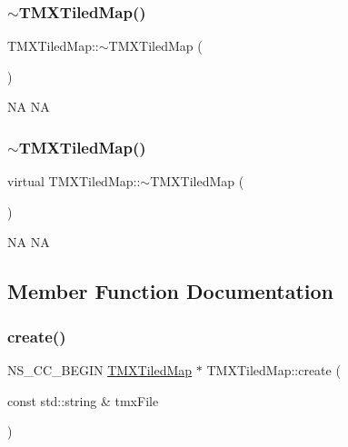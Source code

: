 \subsubsection{\texorpdfstring{$\sim$\+T\+M\+X\+Tiled\+Map()}{~TMXTiledMap()}\hspace{0.1cm}{\footnotesize\ttfamily [1/2]}}
{\footnotesize\ttfamily T\+M\+X\+Tiled\+Map\+::$\sim$\+T\+M\+X\+Tiled\+Map (\begin{DoxyParamCaption}{ }\end{DoxyParamCaption})\hspace{0.3cm}{\ttfamily [virtual]}}

NA  NA \mbox{\label{classTMXTiledMap_a4b8952527c10c7ab9397e215b7bd116c}} 
\subsubsection{\texorpdfstring{$\sim$\+T\+M\+X\+Tiled\+Map()}{~TMXTiledMap()}\hspace{0.1cm}{\footnotesize\ttfamily [2/2]}}
{\footnotesize\ttfamily virtual T\+M\+X\+Tiled\+Map\+::$\sim$\+T\+M\+X\+Tiled\+Map (\begin{DoxyParamCaption}{ }\end{DoxyParamCaption})\hspace{0.3cm}{\ttfamily [virtual]}}

NA  NA 

\subsection{Member Function Documentation}
\mbox{\label{classTMXTiledMap_a64387b3c4d0369044917a4ef43f31aa0}} 
\subsubsection{\texorpdfstring{create()}{create()}\hspace{0.1cm}{\footnotesize\ttfamily [1/2]}}
{\footnotesize\ttfamily N\+S\+\_\+\+C\+C\+\_\+\+B\+E\+G\+IN \hyperlink{classTMXTiledMap}{T\+M\+X\+Tiled\+Map} $\ast$ T\+M\+X\+Tiled\+Map\+::create (\begin{DoxyParamCaption}\item[{const std\+::string \&}]{tmx\+File }\end{DoxyParamCaption})\hspace{0.3cm}{\ttfamily [static]}}

